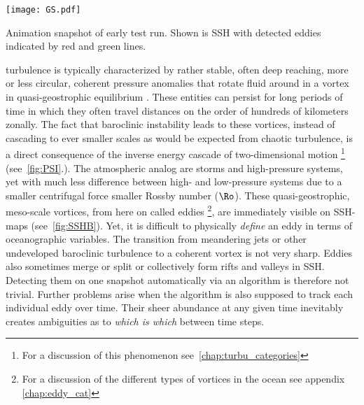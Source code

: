 
\begin{marginfigure}
\texttt{[image: GS.pdf]}
\caption{Animation snapshot of early test run. Shown is SSH with detected eddies indicated by red and green lines.}
\end{marginfigure}

 turbulence is typically characterized by rather stable, often deep reaching, more or less circular, coherent pressure anomalies that rotate fluid around in a vortex in quasi-geostrophic equilibrium \citep{Zhang2013}. These entities can persist for long periods of time in which they often travel distances on the order of hundreds of kilometers
zonally. The fact that baroclinic instability leads to these vortices, instead of cascading to ever smaller scales as would be expected from chaotic
turbulence, is a direct consequence of the inverse energy cascade of two-dimensional motion \citet{Rhines1979,Meneguzzis1988} \footnote{For a discussion of this phenomenon see~\cref{chap:turbu_categories}} (see~\cref{fig:PSI}.).
The atmospheric analog are storms and high-pressure systems, yet with much less difference between high- and low-pressure systems due to
a smaller centrifugal force \ie smaller Rossby number ($\Ro$). These quasi-geostrophic, meso-scale vortices, from here on called eddies \footnote{For a discussion of
the different types of vortices in the ocean see appendix \cref{chap:eddy_cat}}, are immediately visible on SSH-maps (see~\cref{fig:SSHB}). Yet, it is difficult to physically \emph{define} an eddy in terms of oceanographic variables. The transition from meandering jets or other undeveloped
baroclinic turbulence to a coherent vortex is not very sharp. Eddies also sometimes merge or split or collectively form rifts and valleys in SSH. Detecting them on one snapshot automatically via an algorithm is therefore not trivial. Further problems arise when the algorithm is also supposed to track each individual eddy over time. Their sheer abundance at any
given time inevitably creates ambiguities  as to \textit{which is which} between time steps. 


